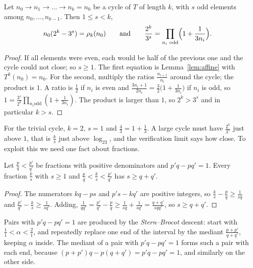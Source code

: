 \begin{proposition}\label{prop:cycle}
Let $n_0\to n_1\to\dots\to n_k=n_0$ be a cycle of $T$ of length $k$, with $s$ odd elements among $n_0,\dots,n_{k-1}$. Then $1\le s<k$,
\[
n_0(2^k-3^s)=\rho_k(n_0)\qquad\text{and}\qquad\frac{2^k}{3^s}=\prod_{n_i\text{ odd}}\Bigl(1+\frac1{3n_i}\Bigr).
\]
\end{proposition}
\begin{proof}
If all elements were even, each would be half of the previous one and the cycle could not close; so $s\ge1$. The first equation is
Lemma~\ref{lem:affine} with $T^k(n_0)=n_0$. For the second, multiply the ratios $\frac{n_{i+1}}{n_i}$ around the cycle; the product is $1$. A ratio is
$\frac12$ if $n_i$ is even and $\frac{3n_i+1}{2n_i}=\frac32\bigl(1+\frac1{3n_i}\bigr)$ if $n_i$ is odd, so $1=\frac{3^s}{2^k}\prod_{n_i\text{
odd}}(1+\frac1{3n_i})$. The product is larger than $1$, so $2^k>3^s$ and in particular $k>s$.
\end{proof}

For the trivial cycle, $k=2$, $s=1$ and $\frac43=1+\frac13$. A large cycle must have $\frac{2^k}{3^s}$ just above $1$, that is $\frac ks$ just above
$\log_23$, and the verification limit says how close. To exploit this we need one fact about fractions.

\begin{lemma}\label{lem:farey}
Let $\frac pq<\frac{p'}{q'}$ be fractions with positive denominators and $p'q-pq'=1$. Every fraction $\frac ks$ with $s\ge1$ and
$\frac pq<\frac ks<\frac{p'}{q'}$ has $s\ge q+q'$.
\end{lemma}
\begin{proof}
The numerators $kq-ps$ and $p's-kq'$ are positive integers, so $\frac ks-\frac pq\ge\frac1{sq}$ and $\frac{p'}{q'}-\frac ks\ge\frac1{sq'}$. Adding,
$\frac1{qq'}=\frac{p'}{q'}-\frac pq\ge\frac1{sq}+\frac1{sq'}=\frac{q+q'}{sqq'}$, so $s\ge q+q'$.
\end{proof}

Pairs with $p'q-pq'=1$ are produced by the \emph{Stern--Brocot} descent: start with $\frac11<\alpha<\frac21$, and repeatedly replace one end of the
interval by the mediant $\frac{p+p'}{q+q'}$, keeping $\alpha$ inside. The mediant of a pair with $p'q-pq'=1$ forms such a pair with each end, because
$(p+p')q-p(q+q')=p'q-pq'=1$, and similarly on the other side.

